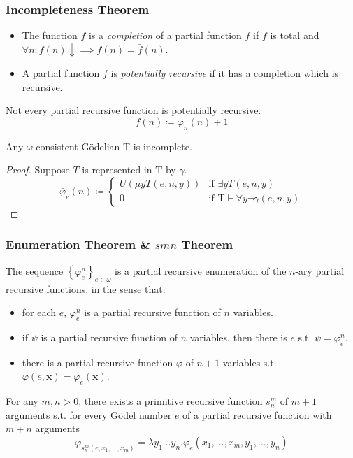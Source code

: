 \documentclass[UTF8,11pt,colorlinks,compress,openany]{beamer}%
\begin{document}
\begin{frame}\frametitle{Incompleteness Theorem}
\setlength\abovedisplayskip{0pt}
\setlength\belowdisplayskip{0pt}
	\begin{itemize}
		\item The function $\bar{f}$ is a \emph{completion} of a partial function $f$ if $\bar{f}$ is total and $\forall n: f(n)\downarrow\implies f(n)=\bar{f}(n)$.
		\item A partial function $f$ is \emph{potentially recursive} if it has a completion which is recursive.
	\end{itemize}
	\begin{block}{Not every partial recursive function is potentially recursive.}
		\[f(n)\coloneqq \varphi_n(n)+1\]
	\end{block}
	\begin{theorem}
		Any $\omega$-consistent G\"odelian $\mathrm{T}$ is incomplete.
	\end{theorem}
	\begin{proof}
		Suppose $T$ is represented in $\mathrm{T}$ by $\gamma$.
		\[
		\bar{\varphi}_e(n)\coloneqq 
		\begin{cases}
		U(\mu y T(e,n,y)) &\text{if } \exists y T(e,n,y)\\
		0 &\text{if } \mathrm{T}\vdash\forall y\neg\gamma(e,n,y)
		\end{cases}
		\]
	\end{proof}
\end{frame}

\begin{frame}\frametitle{Enumeration Theorem \& $smn$ Theorem}
	\begin{theorem}
		The sequence $\left\{\varphi_e^n\right\}_{e\in\omega}$ is a partial recursive enumeration of the $n$-ary partial recursive functions, in the sense that: 
		\begin{itemize}
			\item for each $e$, $\varphi_e^n$ is a partial recursive function of $n$ variables.
			\item if $\psi$ is a partial recursive function of $n$ variables, then there is $e$ s.t. $\psi=\varphi_e^n$.
			\item there is a partial recursive function $\varphi$ of $n+1$ variables s.t. $\varphi(e,\mathbf{x})=\varphi_e(\mathbf{x})$.
		\end{itemize}
	\end{theorem}
	\begin{theorem}
		For any $m, n > 0$, there exists a primitive recursive function $s_n^m$ of $m + 1$ arguments s.t. for every G\"odel number $e$ of a partial recursive function with $m + n$ arguments
	\setlength\abovedisplayskip{0pt}
	\setlength\belowdisplayskip{0pt}
		\[\varphi_{s_n^m (e,x_1,\dots,x_m)}=\lambda y_1\dots y_n.\varphi_e(x_1,\dots,x_m,y_1,\dots,y_n)\]
	\end{theorem}
\end{frame}
\end{document}
